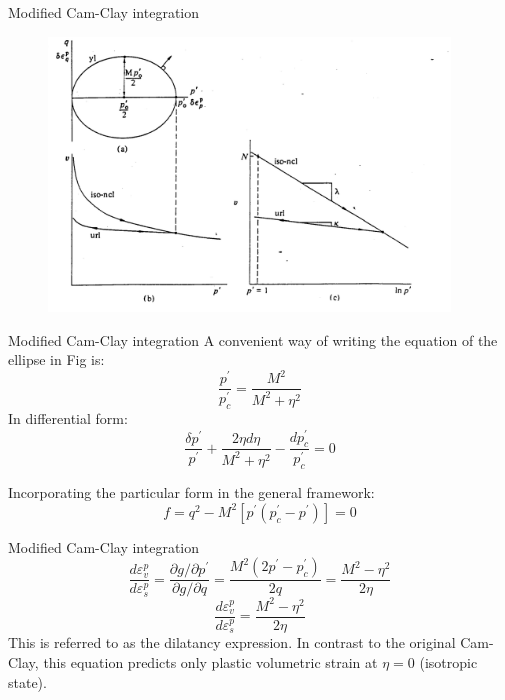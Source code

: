 \documentclass[notes]{beamer}
\begin{document}
\begin{frame}{Modified Cam-Clay integration}
	\begin{figure}
		\includegraphics[width=0.95\textwidth]{figs/mcc-ellipse.png}
	\end{figure}
\end{frame}

\begin{frame}{Modified Cam-Clay integration}
	A convenient way of writing the equation of the ellipse in Fig is:
	\begin{equation*}
	\frac{p^\prime}{p_c^\prime} = \frac{M^2}{M^2 + \eta^2}
	\end{equation*}
	In differential form:
	\begin{equation*}
	\frac{\delta p^\prime}{p^\prime} + \frac{2\eta d\eta}{M^2 + \eta^2} - \frac{dp_c^\prime}{p_c^\prime} = 0
	\end{equation*}

	Incorporating the particular form in the general framework:
	\begin{equation*}
	f = q^2 - M^2 [p^\prime (p_c^\prime - p^\prime)] = 0
	\end{equation*}
\end{frame}


\begin{frame}{Modified Cam-Clay integration}
	\begin{equation*}
		\frac{d\varepsilon_v^p}{d\varepsilon_s^p} = \frac{\partial g / \partial p^\prime}{\partial g / \partial q} = \frac{M^2 (2p^\prime - p_c^\prime)}{2q} = \frac{M^2 - \eta^2}{2\eta}
	\end{equation*}
	\begin{equation*}
	\frac{d\varepsilon_v^p}{d\varepsilon_s^p} = \frac{M^2 - \eta^2}{2 \eta}
	\end{equation*}
	This is referred to as the dilatancy expression. In contrast to the original Cam-Clay, this equation predicts only plastic volumetric strain at $\eta = 0$ (isotropic state).
\end{frame}
\end{document}
